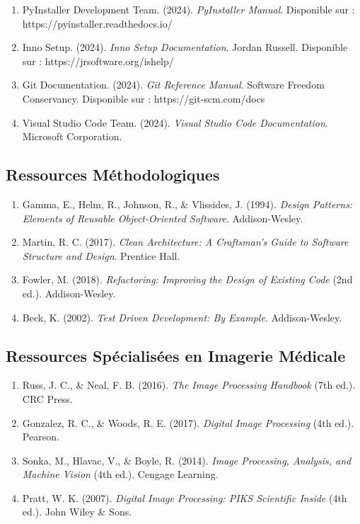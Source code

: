 \documentclass[12pt,a4paper]{article}
\begin{document}
\begin{enumerate}
\item PyInstaller Development Team. (2024). \textit{PyInstaller Manual}. Disponible sur : https://pyinstaller.readthedocs.io/

\item Inno Setup. (2024). \textit{Inno Setup Documentation}. Jordan Russell. Disponible sur : https://jrsoftware.org/ishelp/

\item Git Documentation. (2024). \textit{Git Reference Manual}. Software Freedom Conservancy. Disponible sur : https://git-scm.com/docs

\item Visual Studio Code Team. (2024). \textit{Visual Studio Code Documentation}. Microsoft Corporation.
\end{enumerate}

\subsection{Ressources Méthodologiques}

\begin{enumerate}
\item Gamma, E., Helm, R., Johnson, R., \& Vlissides, J. (1994). \textit{Design Patterns: Elements of Reusable Object-Oriented Software}. Addison-Wesley.

\item Martin, R. C. (2017). \textit{Clean Architecture: A Craftsman's Guide to Software Structure and Design}. Prentice Hall.

\item Fowler, M. (2018). \textit{Refactoring: Improving the Design of Existing Code} (2nd ed.). Addison-Wesley.

\item Beck, K. (2002). \textit{Test Driven Development: By Example}. Addison-Wesley.
\end{enumerate}

\subsection{Ressources Spécialisées en Imagerie Médicale}

\begin{enumerate}
\item Russ, J. C., \& Neal, F. B. (2016). \textit{The Image Processing Handbook} (7th ed.). CRC Press.

\item Gonzalez, R. C., \& Woods, R. E. (2017). \textit{Digital Image Processing} (4th ed.). Pearson.

\item Sonka, M., Hlavac, V., \& Boyle, R. (2014). \textit{Image Processing, Analysis, and Machine Vision} (4th ed.). Cengage Learning.

\item Pratt, W. K. (2007). \textit{Digital Image Processing: PIKS Scientific Inside} (4th ed.). John Wiley \& Sons.
\end{enumerate}
\end{document}
